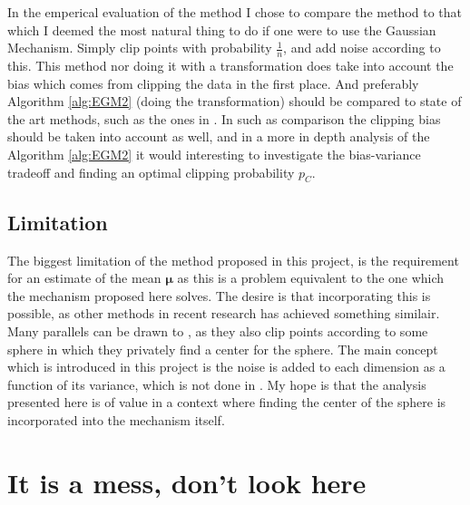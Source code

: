 \documentclass[a4paper,12pt]{article}
\begin{document}
In the emperical evaluation of the method I chose to compare the method
to that which I deemed the most natural thing to do if 
one were to use the Gaussian Mechanism. Simply clip points with 
probability $\frac{1}{n}$, and add noise according to this.
This method nor doing it with a transformation does take into account
the bias which comes from clipping the data in the first place.
And preferably Algorithm \ref{alg:EGM2} (doing the transformation) should
be compared to state of the art methods, such as the ones in \cite{coinpress, Huang2021}.
In such as comparison the clipping bias should be taken into account as well, and
in a more in depth analysis of the Algorithm \ref{alg:EGM2} it
would interesting to investigate the bias-variance tradeoff and finding an
optimal clipping probability $p_{C}$.


\subsection{Limitation}
The biggest limitation of the method proposed in this project, is the requirement for an estimate
of the mean $\bm{\mu}$ as this is a problem equivalent to the one which the mechanism proposed here solves.
The desire is that incorporating this is possible, as other methods in recent research has achieved something similair.
Many parallels can be drawn to \cite{Huang2021}, as they also clip points
according to some sphere in which they privately find a center for the sphere. The main concept which is introduced in this project
is the noise is added to each dimension as a function of its variance, which is not done in \cite{Huang2021}.
My hope is that the analysis presented here is of value in a context where finding the center of the sphere is incorporated
into the mechanism itself.

\newpage
\section{It is a mess, don't look here}
\end{document}
